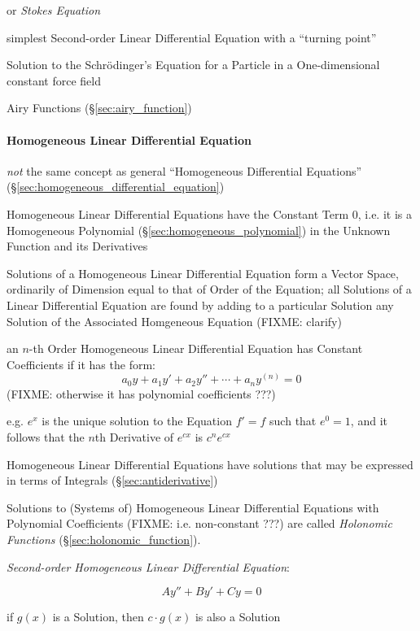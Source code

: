 or \emph{Stokes Equation}

simplest Second-order Linear Differential Equation with a ``turning point''

Solution to the Schr\"odinger's Equation for a Particle in a One-dimensional
constant force field

Airy Functions (\S\ref{sec:airy_function})



\paragraph{Homogeneous Linear Differential Equation}
\label{sec:homogeneous_linear_differential}\hfill

\emph{not} the same concept as general ``Homogeneous Differential Equations''
(\S\ref{sec:homogeneous_differential_equation})

Homogeneous Linear Differential Equations have the Constant Term $0$, i.e. it
is a Homogeneous Polynomial (\S\ref{sec:homogeneous_polynomial}) in the Unknown
Function and its Derivatives

Solutions of a Homogeneous Linear Differential Equation form a Vector Space,
ordinarily of Dimension equal to that of Order of the Equation; all Solutions
of a Linear Differential Equation are found by adding to a particular Solution
any Solution of the Associated Homgeneous Equation (FIXME: clarify)

an $n$-th Order Homogeneous Linear Differential Equation has Constant
Coefficients if it has the form:
\[
  a_0y + a_1y' + a_2y'' + \cdots + a_ny^{(n)} = 0
\]
(FIXME: otherwise it has polynomial coefficients ???)

e.g. $e^x$ is the unique solution to the Equation $f' = f$ such that $e^0 = 1$,
and it follows that the $n$th Derivative of $e^{cx}$ is $c^n e^{cx}$

Homogeneous Linear Differential Equations have solutions that may be expressed
in terms of Integrals (\S\ref{sec:antiderivative})

Solutions to (Systems of) Homogeneous Linear Differential Equations with
Polynomial Coefficients (FIXME: i.e. non-constant ???) are called
\emph{Holonomic Functions} (\S\ref{sec:holonomic_function}).

\emph{Second-order Homogeneous Linear Differential Equation}:

\[
  A y'' + B y' + C y = 0
\]

if $g(x)$ is a Solution, then $c\cdot{g(x)}$ is also a Solution

